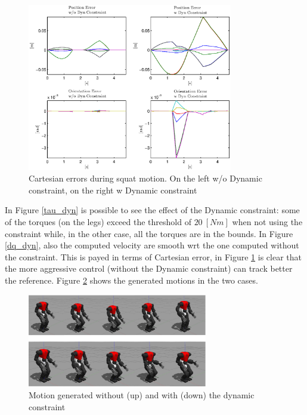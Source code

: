 \begin{figure}[!h]
\vspace{2 mm}
\centering
\includegraphics[width=0.8\textwidth]{images/dyn/Cartesian_error_dyn.eps}
\caption{Cartesian errors during squat motion. On the left w/o Dynamic constraint, on the right w Dynamic constraint}
\label{cartesian_error_dyn}
\end{figure}
In Figure \ref{tau_dyn} is possible to see the effect of the Dynamic constraint: some of the torques (on the legs) exceed the threshold of $20 \ [Nm]$ when not using the constraint while, in the other case, all the torques are in the bounds. In Figure \ref{dq_dyn}, also the computed velocity are smooth wrt the one computed without the constraint. This is payed in terms of Cartesian error, in Figure \ref{cartesian_error_dyn} is clear that the more aggressive control (without the Dynamic constraint) can track better the reference. Figure \ref{motion_dyn_constr} shows the generated motions in the two cases.

\begin{figure}[!ht]
\vspace{2 mm}
\centering
\includegraphics[width=0.7\textwidth]{images/dyn/dyn_constr.eps}
\caption{Motion generated without (up) and with (down) the dynamic constraint}
\label{motion_dyn_constr}
\end{figure}

